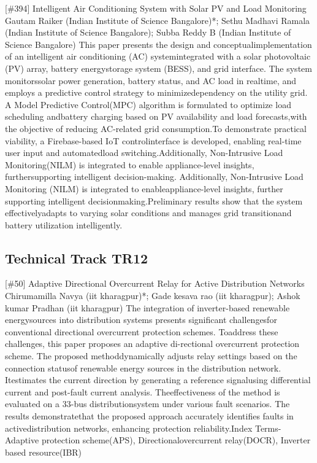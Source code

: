{} \begin{abstract_online} {[\#394] Intelligent Air Conditioning System with Solar PV and Load Monitoring} {} {Gautam Raiker (Indian Institute of Science Bangalore)*; Sethu Madhavi  Ramala (Indian Institute of Science Bangalore); Subba  Reddy B (Indian Institute of Science Bangalore)} {} This paper presents the design and conceptualimplementation of an intelligent air conditioning (AC) systemintegrated with a solar photovoltaic (PV) array, battery energystorage system (BESS), and grid interface. The system monitorssolar power generation, battery status, and AC load in realtime, and employs a predictive control strategy to minimizedependency on the utility grid. A Model Predictive Control(MPC) algorithm is formulated to optimize load scheduling andbattery charging based on PV availability and load forecasts,with the objective of reducing AC-related grid consumption.To demonstrate practical viability, a Firebase-based IoT controlinterface is developed, enabling real-time user input and automatedload switching.Additionally, Non-Intrusive Load Monitoring(NILM) is integrated to enable appliance-level insights, furthersupporting intelligent decision-making. Additionally, Non-Intrusive Load Monitoring (NILM) is integrated to enableappliance-level insights, further supporting intelligent decisionmaking.Preliminary results show that the system effectivelyadapts to varying solar conditions and manages grid transitionand battery utilization intelligently. \end{abstract_online} 
\clearpage \subsection{Technical Track TR12}\nopagebreak {} \begin{abstract_online} {[\#50] Adaptive Directional Overcurrent Relay for Active Distribution Networks} {} {Chirumamilla Navya (iit kharagpur)*; Gade kesava rao (iit kharagpur); Ashok kumar Pradhan (iit kharagpur)} {} The integration of inverter-based renewable energysources into distribution systems presents significant challengesfor conventional directional overcurrent protection schemes. Toaddress these challenges, this paper proposes an adaptive di-rectional overcurrent protection scheme. The proposed methoddynamically adjusts relay settings based on the connection statusof renewable energy sources in the distribution network. Itestimates the current direction by generating a reference signalusing differential current and post-fault current analysis. Theeffectiveness of the method is evaluated on a 33-bus distributionsystem under various fault scenarios. The results demonstratethat the proposed approach accurately identifies faults in activedistribution networks, enhancing protection reliability.Index Terms-Adaptive protection scheme(APS), Directionalovercurrent relay(DOCR), Inverter based resource(IBR) \end{abstract_online} 

